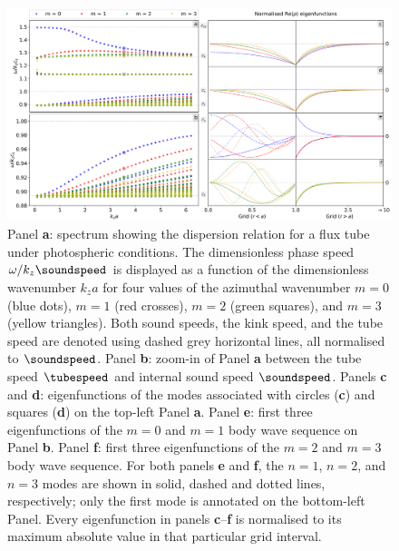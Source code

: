 \begin{figure}[t]
  \centering
  \includegraphics[width=\textwidth]{fluxtube_photospheric.png}
  \caption{
    Panel \textbf{a}: spectrum showing the dispersion relation for a flux tube under photospheric conditions. The dimensionless phase speed $\omega / k_z \soundspeed$ is displayed as a function of the dimensionless wavenumber $k_z a$ for four values of the azimuthal wavenumber $m = 0$ (blue dots), $m = 1$ (red crosses), $m = 2$ (green squares), and $m = 3$ (yellow triangles). Both sound speeds, the kink speed, and the tube speed are denoted using dashed grey horizontal lines, all normalised to $\soundspeed$. Panel \textbf{b}: zoom-in of Panel \textbf{a} between the tube speed $\tubespeed$ and internal sound speed $\soundspeed$. Panels \textbf{c} and \textbf{d}: eigenfunctions of the modes associated with circles (\textbf{c}) and squares (\textbf{d}) on the top-left Panel \textbf{a}. Panel \textbf{e}: first three eigenfunctions of the $m = 0$ and $m = 1$ body wave sequence on Panel \textbf{b}. Panel \textbf{f}: first three eigenfunctions of the $m = 2$ and $m = 3$ body wave sequence. For both panels \textbf{e} and \textbf{f}, the $n = 1$, $n = 2$, and $n = 3$ modes are shown in solid, dashed and dotted lines, respectively; only the first mode is annotated on the bottom-left Panel. Every eigenfunction in panels \textbf{c}--\textbf{f} is normalised to its maximum absolute value in that particular grid interval.
  }
  \label{fig: fluxtube_photospheric}
\end{figure}

